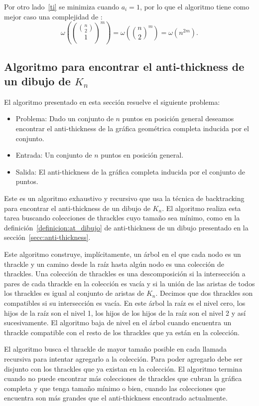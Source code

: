   Por otro lado~\ref{ti} se minimiza cuando $a_i=1$, por lo que el algoritmo tiene como mejor caso una complejidad de :
  \[\omega\left(\binom{\binom{n}{2}}{1}^m\right)= \omega\left( \binom{n}{2}^m\right)= \omega(n^{2m}).\]

\subsection{Algoritmo para encontrar el anti-thickness de un dibujo de
$K_n$}\label{secc:anti-thickness-dibujo}

  El algoritmo presentado en esta sección resuelve el siguiente problema:
  \begin{itemize}
    \item[] Problema: Dado un conjunto de $n$ puntos en posición general deseamos encontrar el
    anti-thickness de la gráfica geométrica completa inducida por el conjunto.
    \item[] Entrada: Un conjunto de $n$ puntos en posición general.
    \item[] Salida: El anti-thickness de la gráfica completa inducida por el conjunto de puntos.
  \end{itemize}

  Este es un algoritmo exhaustivo y recursivo que usa la técnica de backtracking para encontrar el
  anti-thickness de un dibujo de $K_n$. El algoritmo realiza esta tarea buscando colecciones de thrackles
  cuyo tamaño sea mínimo, como en la definición~\ref{definicion:at_dibujo} de anti-thickness de un dibujo
  presentado en la sección~\ref{secc:anti-thickness}.

  Este algoritmo construye, implícitamente, un árbol en el que cada nodo es un thrackle y un camino desde
  la raíz hasta algún nodo es una colección de thrackles. Una colección de thrackles es una descomposición
  si la intersección a pares de cada thrackle en la colección es vacía y si la unión de las aristas de
  todos los thrackles es igual al conjunto de aristas de $K_n$. Decimos que dos thrackles son compatibles
  si su intersección es vacía. En este árbol la raíz es el nivel cero, los hijos de la raíz son el nivel 1,
  los hijos de los hijos de la raíz son el nivel 2 y así sucesivamente. El algoritmo baja de nivel en el
  árbol cuando encuentra un thrackle compatible con el resto de los thrackles que ya están en la colección.

  El algoritmo busca el thrackle de mayor tamaño posible en cada llamada recursiva para intentar agregarlo
  a la colección. Para poder agregarlo debe ser disjunto con los thrackles que ya existan en la colección.
  El algoritmo termina cuando no puede encontrar más colecciones de thrackles que cubran la gráfica
  completa y que tenga tamaño mínimo o bien, cuando las colecciones que encuentra son más grandes que el
  anti-thickness encontrado actualmente.

